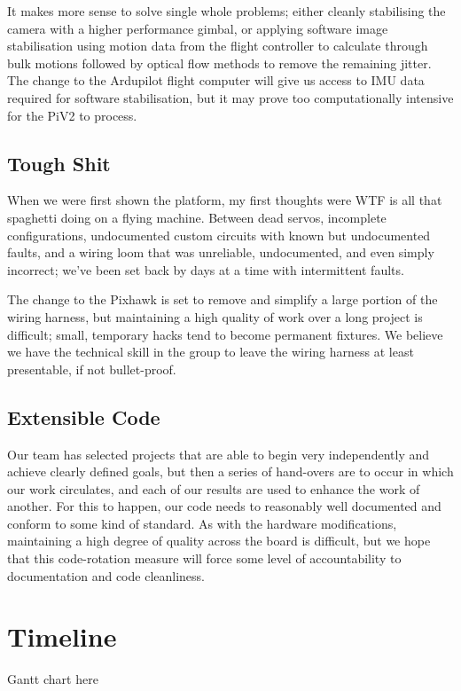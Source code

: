 \documentclass[11pt]{article}
\begin{document}
      It makes more sense to solve single whole problems; either cleanly stabilising the camera with a higher performance gimbal, or applying software image stabilisation using motion data from the flight controller to calculate through bulk motions followed by optical flow methods to remove the remaining jitter.
      The change to the Ardupilot flight computer will give us access to IMU data required for software stabilisation, but it may prove too computationally intensive for the PiV2 to process.


    \subsection{Tough Shit}
    \label{sec:Reliability}
      When we were first shown the platform, my first thoughts were WTF is all that spaghetti doing on a flying machine.
      Between dead servos, incomplete configurations, undocumented custom circuits with known but undocumented faults, and a wiring loom that was unreliable, undocumented, and even simply incorrect;  we've been set back by days at a time with intermittent faults.

      The change to the Pixhawk is set to remove and simplify a large portion of the wiring harness, but maintaining a high quality of work over a long project is difficult; small, temporary hacks tend to become permanent fixtures.  We believe we have the technical skill in the group to leave the wiring harness at least presentable, if not bullet-proof.

    \subsection{Extensible Code}
      Our team has selected projects that are able to begin very independently and achieve clearly defined goals, but then a series of hand-overs are to occur in which our work circulates, and each of our results are used to enhance the work of another.
      For this to happen, our code needs to reasonably well documented and conform to some kind of standard.  As with the hardware modifications, maintaining a high degree of quality across the board is difficult, but we hope that this code-rotation measure will force some level of accountability to documentation and code cleanliness.




  \section{Timeline}
    Gantt chart here
\end{document}
